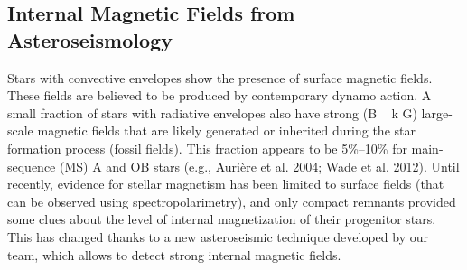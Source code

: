 \color{red}\subsection{Internal Magnetic Fields from Asteroseismology}
Stars with convective envelopes show the presence of
surface magnetic fields. These fields are believed to be produced by contemporary dynamo action.
A small fraction of stars with radiative envelopes also have strong (B ~ k G)
large-scale magnetic fields that are likely generated or inherited during the star
formation process (fossil fields). This fraction appears to be 5\%–10\% for main-sequence (MS)
A and OB stars (e.g., Aurière et al. 2004; Wade et al. 2012).
Until recently, evidence for stellar magnetism has been limited to surface fields (that can be observed using spectropolarimetry),
and only compact remnants provided some clues about the level of internal magnetization of their progenitor stars.
This has changed thanks to a new asteroseismic technique developed by our team, which allows to detect strong internal magnetic fields.
